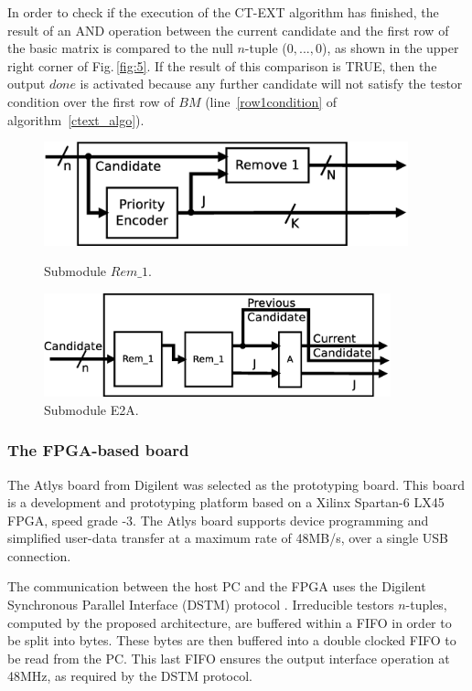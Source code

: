 \documentclass[authoryear,preprint,review,12pt]{elsarticle}
\begin{document}
In order to check if the execution of the CT-EXT  algorithm has finished, the result of an AND 
operation between the current candidate and the first row of the basic matrix is compared to 
the null $n$-tuple ($0,...,0$), as shown in the upper right corner of Fig.\,\ref{fig:5}. If the 
result of this comparison is TRUE, then the output $done$ is activated because any further 
candidate will not satisfy the testor condition over the first row of $BM$ 
(line~\ref{row1condition} of algorithm~\ref{ctext_algo}).

\begin{figure}[htb]
\centering
\begin{minipage}{.5\textwidth}
  \centering
   \includegraphics[width=\linewidth , height=3cm]{Rem1.eps}
  \caption{Submodule $Rem\_1$.}
  \label{fig:subRem1}
\end{minipage}%
\begin{minipage}{.5\textwidth}
  \centering
   \includegraphics[width=\linewidth , height=3cm]{EA2.eps}
  \caption{Submodule E2A.}
  \label{fig:subEA2}
\end{minipage}
\end{figure}

\subsubsection*{The FPGA-based board}
The Atlys board from Digilent \citep{R15} was selected as the prototyping board. This board is 
a development and prototyping platform based on a Xilinx Spartan-6 LX45 FPGA, speed grade -3. The Atlys board 
supports device programming and simplified user-data transfer at a maximum rate of 48MB/s, over 
a single USB connection. 

The communication between the host PC and the FPGA uses the Digilent Synchronous 
Parallel Interface (DSTM) protocol \citep{R25}. Irreducible testors $n$-tuples, computed by the 
proposed architecture, are buffered within a FIFO in order to be split into bytes. These bytes 
are then buffered into a double clocked FIFO \citep{R26} to be read from the PC. This last FIFO 
ensures the output interface operation at 48MHz, as required by the DSTM protocol.
\end{document}
